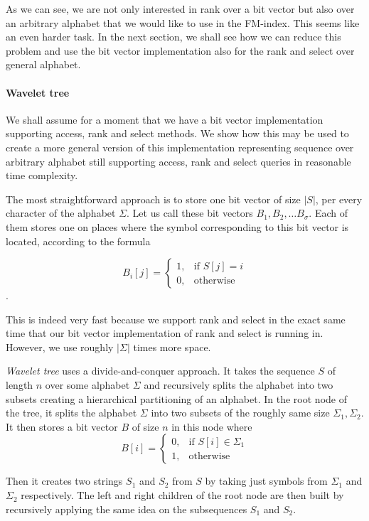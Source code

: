 As we can see, we are not only interested in rank over a bit vector but also over an arbitrary
alphabet that we would like to use in the FM-index. This seems like an even harder task.
In the next section, we shall see how we can reduce this problem and use the bit vector
implementation also for the rank and select over general alphabet.

\paragraph{Wavelet tree}
\label{section:WaweletTree}

We shall assume for a moment that we have a bit vector implementation supporting
access, rank and select methods. We show how this may be used to create
a more general version of this implementation representing sequence over arbitrary
alphabet still supporting access, rank and select queries in reasonable time complexity.

The most straightforward approach is to store one bit vector of size $|S|$,
per every character of the alphabet $\Sigma$. Let us call these bit vectors $B_1,
B_2, \ldots B_{\sigma}$. Each of them stores one on places where the symbol corresponding
to this bit vector is located, according to the formula

\[
    B_i[j]= 
\begin{cases}
	1,& \text{if } S[j]=i \\
    0,& \text{otherwise}
\end{cases}
\].

This is indeed very fast because we support rank and select in the exact same time
that our bit vector implementation of rank and select is running in. However, we use
roughly $|\Sigma|$ times more space.

\textit{Wavelet tree} uses a divide-and-conquer approach. It takes the sequence $S$ of
length $n$ over some alphabet $\Sigma$ and recursively splits the alphabet into
two subsets creating a hierarchical partitioning of an alphabet. In the root node
of the tree, it splits the alphabet $\Sigma$ into two subsets of the roughly same
size $\Sigma_1, \Sigma_2$. It then stores a bit vector $B$ of size $n$ in this node
where
\[
    B[i]= 
\begin{cases}
    0,& \text{if } S[i]\in \Sigma_1\\
    1,              & \text{otherwise}
\end{cases}
\]

Then it creates two strings $S_1$ and $S_2$ from $S$ by taking just symbols
from $\Sigma_1$ and $\Sigma_2$ respectively. The left and right children of the root node
are then built by recursively applying the same idea on the subsequences $S_1$ and $S_2$.

